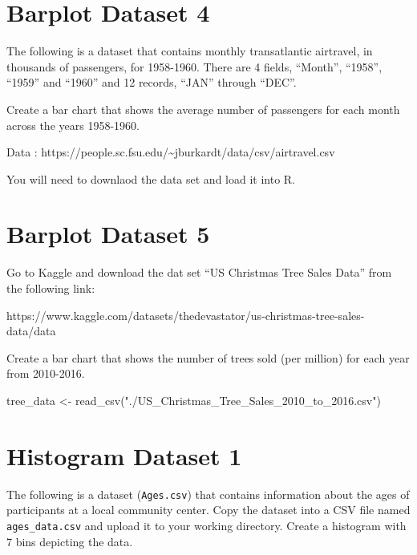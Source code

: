 \documentclass[
  letterpaper,
  DIV=11,
  numbers=noendperiod]{scrreprt}
\newenvironment{Shaded}{\begin{snugshade}}{\end{snugshade}}
\newcommand{\FunctionTok}[1]{\textcolor[rgb]{0.28,0.35,0.67}{#1}}
\newcommand{\NormalTok}[1]{\textcolor[rgb]{0.00,0.23,0.31}{#1}}
\newcommand{\OtherTok}[1]{\textcolor[rgb]{0.00,0.23,0.31}{#1}}
\newcommand{\StringTok}[1]{\textcolor[rgb]{0.13,0.47,0.30}{#1}}
\begin{document}
\section*{Barplot Dataset 4}\label{barplot-dataset-4}


The following is a dataset that contains monthly transatlantic
airtravel, in thousands of passengers, for 1958-1960. There are 4
fields, ``Month'', ``1958'', ``1959'' and ``1960'' and 12 records,
``JAN'' through ``DEC''.

Create a bar chart that shows the average number of passengers for each
month across the years 1958-1960.

Data :
https://people.sc.fsu.edu/\textasciitilde jburkardt/data/csv/airtravel.csv

You will need to downlaod the data set and load it into R.

\section*{Barplot Dataset 5}\label{barplot-dataset-5}


Go to Kaggle and download the dat set ``US Christmas Tree Sales Data''
from the following link:

https://www.kaggle.com/datasets/thedevastator/us-christmas-tree-sales-data/data

Create a bar chart that shows the number of trees sold (per million) for
each year from 2010-2016.

\begin{Shaded}
\begin{Highlighting}[]
\NormalTok{tree\_data }\OtherTok{\textless{}{-}} \FunctionTok{read\_csv}\NormalTok{(}\StringTok{"./US\_Christmas\_Tree\_Sales\_2010\_to\_2016.csv"}\NormalTok{)}
\end{Highlighting}
\end{Shaded}

\section*{Histogram Dataset 1}\label{histogram-dataset-1}


The following is a dataset (\texttt{Ages.csv}) that contains information
about the ages of participants at a local community center. Copy the
dataset into a CSV file named \texttt{ages\_data.csv} and upload it to
your working directory. Create a histogram with 7 bins depicting the
data.
\end{document}
